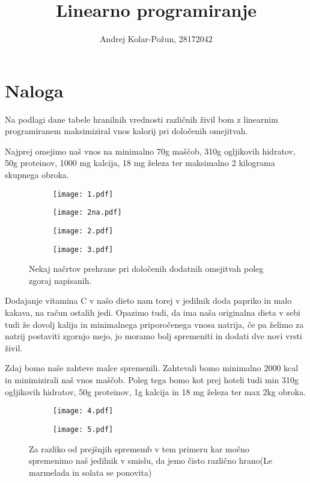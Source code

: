 \documentclass{article}
\title{Linearno programiranje}
\author{Andrej Kolar-Požun, 28172042}
\begin{document}
\maketitle
\newpage
{}

\section{Naloga}
Na podlagi dane tabele hranilnih vrednosti različnih živil bom z linearnim programiranem maksimiziral vnos kalorij pri določenih omejitvah.

Najprej omejimo naš vnos na minimalno 70g maščob, 310g ogljikovih hidratov, 50g proteinov, 
1000 mg kalcija, 18 mg železa ter maksimalno 2 kilograma skupnega obroka. 
\begin{figure}[H]
\begin{subfigure}{.5\textwidth}
\texttt{[image: 1.pdf]}
\end{subfigure}
\begin{subfigure}{.5\textwidth}
\texttt{[image: 2na.pdf]}
\end{subfigure}
\end{figure}
\begin{figure}[H]
\begin{subfigure}{.5\textwidth}
\texttt{[image: 2.pdf]}
\end{subfigure}
\begin{subfigure}{.5\textwidth}
\texttt{[image: 3.pdf]}
\end{subfigure}
\caption*{Nekaj načrtov prehrane pri določenih dodatnih omejitvah poleg zgoraj napisanih.}
\end{figure}

Dodajanje vitamina C v našo dieto nam torej v jedilnik doda papriko in malo kakava, na račun ostalih jedi. 
Opazimo tudi, da ima naša originalna dieta v sebi tudi že dovolj kalija in minimalnega priporočenega vnosa natrija, če pa želimo za natrij postaviti zgornjo mejo, jo moramo bolj spremeniti in dodati dve novi vrsti živil.

\newpage
Zdaj bomo naše zahteve malce spremenili. Zahtevali bomo minimalno 2000 kcal in minimizirali naš vnos maščob. Poleg tega bomo kot prej hoteli tudi min 310g ogljikovih hidratov, 50g proteinov, 1g kalcija in 18 mg železa ter max 2kg obroka.

\begin{figure}[H]
\begin{subfigure}{.5\textwidth}
\texttt{[image: 4.pdf]}
\end{subfigure}
\begin{subfigure}{.5\textwidth}
\texttt{[image: 5.pdf]}
\end{subfigure}
\caption*{Za razliko od prejšnjih sprememb v tem primeru kar močno spremenimo naš jedilnik v smislu, da jemo čisto različno hrano(Le marmelada in solata se ponovita)}
\end{figure}
\end{document}
